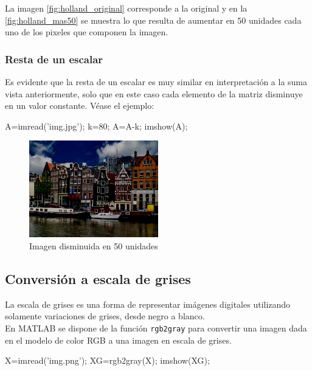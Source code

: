 La imagen \ref{fig:holland_original} corresponde a la original y en
la \ref{fig:holland_mas50} se muestra lo que resulta de aumentar
en 50 unidades cada uno de los pixeles que componen la imagen.

\subsubsection{Resta de un escalar}

Es evidente que la resta de un escalar es muy similar en interpretación
a la suma vista anteriormente, solo que en este caso cada elemento de la
matriz disminuye en un valor constante. Véase el ejemplo:

\begin{matlab}
A=imread('img.jpg');
k=80;
A=A-k;
imshow(A);
\end{matlab}

\begin{figure}[htbp]
    \centering
    \includegraphics[width=0.5\textwidth]{images/ch7/holland_menos50.png}
    \caption{Imagen disminuida en 50 unidades}
    \label{fig:holland_menos50}
\end{figure}

\subsection{Conversión a escala de grises}

La escala de grises es una forma de representar imágenes digitales
utilizando solamente variaciones de grises, desde negro a blanco. \\

En MATLAB se dispone de la función \texttt{rgb2gray} para convertir una
imagen dada en el modelo de color RGB a una imagen en escala de grises.

\begin{matlab}
X=imread('img.png');
XG=rgb2gray(X);
imshow(XG);
\end{matlab}


